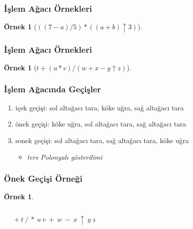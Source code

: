\documentclass[dvipsnames]{beamer}
\theoremstyle{definition}
\theoremstyle{example}
\newtheorem{ornek}[theorem]{Örnek}
\theoremstyle{plain}
\begin{document}
\begin{frame}
  \frametitle{İşlem Ağacı Örnekleri}

  \begin{ornek}[$((7-a)/5)*((a+b) \uparrow 3)$]
    \begin{center}
    \end{center}
  \end{ornek}
\end{frame}

\begin{frame}
  \frametitle{İşlem Ağacı Örnekleri}

  \begin{ornek}[$t+(u*v)/(w+x-y \uparrow z)$]
    \begin{center}
    \end{center}
  \end{ornek}
\end{frame}

\begin{frame}
  \frametitle{İşlem Ağacında Geçişler}

  \begin{enumerate}
    \item \alert{içek geçişi}: sol altağacı tara, köke uğra, sağ altağacı tara

    \pause
    \medskip
    \item \alert{önek geçişi}: köke uğra, sol altağacı tara, sağ altağacı tara

    \pause
    \medskip
    \item \alert{sonek geçişi}: sol altağacı tara, sağ altağacı tara, köke uğra
    \begin{itemize}
      \item \emph{ters Polonyalı gösterilimi}
    \end{itemize}
  \end{enumerate}
\end{frame}

\begin{frame}
  \frametitle{Önek Geçişi Örneği}

  \begin{ornek}
    \begin{columns}
      \begin{center}
      \end{center}

      \pause
      $+ ~ t ~ / ~ * ~ u ~ v ~ + ~ w ~ - ~ x ~ \uparrow ~ y ~ z$
    \end{columns}
  \end{ornek}
\end{frame}
\end{document}
